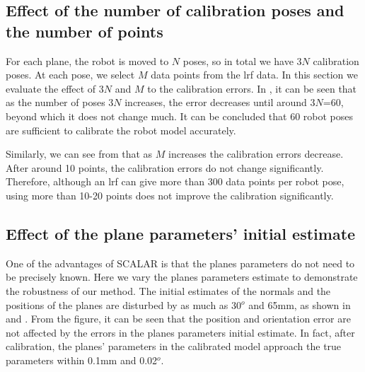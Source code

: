 \subsection{Effect of the number of calibration poses and the number of points}
\label{sec:calib_poses}
For each plane, the robot is moved to $N$ poses, so in total we have $3N$ calibration poses. At each pose, we select $M$ data points from the \ac{lrf} data. In this section we evaluate the effect of $3N$ and $M$ to the calibration errors. In , it can be seen that as the number of poses $3N$ increases, the error decreases until around $3N$=60, beyond which it does not change much. It can be concluded that 60 robot poses are sufficient to calibrate the robot model accurately. 


Similarly, we can see from  that as $M$ increases the calibration errors decrease. After around 10 points, the calibration errors do not change significantly. Therefore, although an \ac{lrf} can give more than 300 data points per robot pose, using more than 10-20 points does not improve the calibration significantly. 



\subsection{Effect of the plane parameters' initial estimate}
\label{sec:plane_params}
One of the advantages of SCALAR is that the planes parameters do not need to be precisely known. Here we vary the planes parameters estimate to demonstrate the robustness of our method. The initial estimates of the normals and the positions of the planes are disturbed by as much as 30$^o$ and 65mm, as shown in  and . From the figure, it can be seen that the position and orientation error are not affected by the errors in the planes parameters initial estimate. In fact, after calibration, the planes' parameters in the calibrated model approach the true parameters within 0.1mm and 0.02$^o$.





